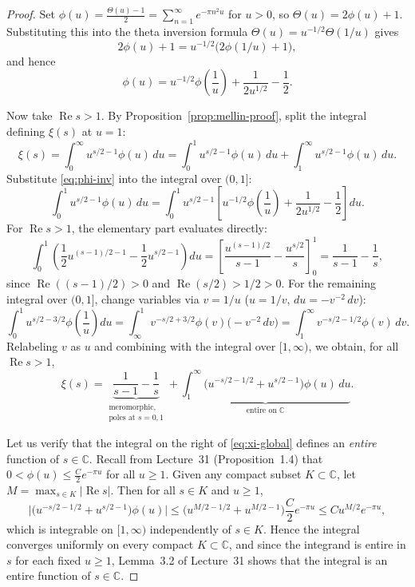 \documentclass[11pt]{article}
\theoremstyle{plain}
\theoremstyle{definition}
\theoremstyle{boldremark}
\theoremstyle{remark}
\numberwithin{equation}{section}
\newcommand{\C}{\mathbb{C}}
\DeclareMathOperator{\Real}{Re}
\begin{document}
\begin{proof}
Set $\phi(u)=\frac{\Theta(u)-1}{2}=\sum_{n=1}^{\infty} e^{-\pi n^2 u}$ for
$u>0$, so $\Theta(u)=2\phi(u)+1$. Substituting this into the theta
inversion formula $\Theta(u)=u^{-1/2}\Theta(1/u)$ gives
\[
 2\phi(u)+1 = u^{-1/2}\bigl(2\phi(1/u)+1\bigr),
\]
and hence
\begin{equation}\label{eq:phi-inv}
 \boxed{\displaystyle
  \phi(u) = u^{-1/2}\phi\!\left(\frac{1}{u}\right) + \frac{1}{2u^{1/2}} - \frac{1}{2}.}
\end{equation}

Now take $\Real s > 1$. By Proposition~\ref{prop:mellin-proof}, split the
integral defining $\xi(s)$ at $u=1$:
\[
 \xi(s) = \int_0^{\infty} u^{s/2-1}\phi(u)\,du
        = \int_0^{1} u^{s/2-1}\phi(u)\,du
        + \int_1^{\infty} u^{s/2-1}\phi(u)\,du.
\]
Substitute \eqref{eq:phi-inv} into the integral over $(0,1]$:
\[
 \int_0^{1} u^{s/2-1}\phi(u)\,du
 = \int_0^{1} u^{s/2-1}
   \left[u^{-1/2}\phi\!\left(\frac{1}{u}\right)
         + \frac{1}{2u^{1/2}} - \frac{1}{2}\right]du.
\]
For $\Real s > 1$, the elementary part evaluates directly:
\[
 \int_0^{1}\left(\frac{1}{2}u^{(s-1)/2-1} - \frac{1}{2}u^{s/2-1}\right)du
 = \left[\frac{u^{(s-1)/2}}{s-1} - \frac{u^{s/2}}{s}\right]_0^1
 = \frac{1}{s-1} - \frac{1}{s},
\]
since $\Real((s-1)/2)>0$ and $\Real(s/2)>1/2>0$. For the remaining integral
over $(0,1]$, change variables via $v=1/u$ ($u=1/v$, $du=-v^{-2}\,dv$):
\[
 \int_0^{1} u^{s/2-3/2}\phi\!\left(\frac{1}{u}\right)du
 = \int_{\infty}^{1} v^{-s/2+3/2}\phi(v)\bigl(-v^{-2}\,dv\bigr)
 = \int_1^{\infty} v^{-s/2-1/2}\phi(v)\,dv.
\]
Relabeling $v$ as $u$ and combining with the integral over $[1,\infty)$, we
obtain, for all $\Real s > 1$,
\begin{equation}\label{eq:xi-global}
 \xi(s) = \underbrace{\frac{1}{s-1} - \frac{1}{s}}_{\substack{\text{meromorphic,}\\\text{poles at }s=0,1}}
        + \underbrace{\int_1^{\infty}
          \bigl(u^{-s/2-1/2} + u^{s/2-1}\bigr)\phi(u)\,du}_{\text{entire on }\C}.
\end{equation}

Let us verify that the integral on the right of \eqref{eq:xi-global}
defines an \emph{entire} function of $s\in\C$. Recall from Lecture~31
(Proposition~1.4) that $0<\phi(u)\leq \frac{C}{2}e^{-\pi u}$ for all
$u\geq 1$. Given any compact subset $K\subset\C$, let
$M=\max_{s\in K}|\Real s|$. Then for all $s\in K$ and $u\geq 1$,
\[
 \bigl|\bigl(u^{-s/2-1/2}+u^{s/2-1}\bigr)\phi(u)\bigr|
 \leq \bigl(u^{M/2-1/2}+u^{M/2-1}\bigr)\frac{C}{2}e^{-\pi u}
 \leq C u^{M/2} e^{-\pi u},
\]
which is integrable on $[1,\infty)$ independently of $s\in K$. Hence the
integral converges uniformly on every compact $K\subset\C$, and since the
integrand is entire in $s$ for each fixed $u\geq 1$, Lemma~3.2 of
Lecture~31 shows that the integral is an entire function of $s\in\C$.


\end{proof}
\end{document}
